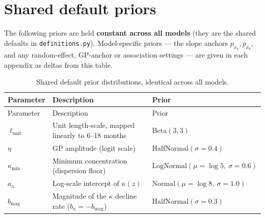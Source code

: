 \documentclass[
  11pt,
  a4paper,
]{report}
\begin{document}
\section{Shared default priors}\label{sec-core-priors}

The following priors are held \textbf{constant across all models} (they
are the shared defaults in \texttt{definitions.py}). Model-specific
priors --- the slope anchors \(p_{x_a}, p_{x_b}\), and any
random-effect, GP-anchor or association settings --- are given in each
appendix as deltas from this table.

\begin{longtable}[]{@{}
  >{\raggedright\arraybackslash}p{}
  >{\raggedright\arraybackslash}p{}
  >{\raggedright\arraybackslash}p{}@{}}
\caption{Shared default prior distributions, identical across all
models.}\label{tbl-core-priors}\tabularnewline
\toprule\noalign{}
\begin{minipage}[b]{\linewidth}\raggedright
Parameter
\end{minipage} & \begin{minipage}[b]{\linewidth}\raggedright
Description
\end{minipage} & \begin{minipage}[b]{\linewidth}\raggedright
Prior
\end{minipage} \\
\midrule\noalign{}
\endfirsthead
\toprule\noalign{}
\begin{minipage}[b]{\linewidth}\raggedright
Parameter
\end{minipage} & \begin{minipage}[b]{\linewidth}\raggedright
Description
\end{minipage} & \begin{minipage}[b]{\linewidth}\raggedright
Prior
\end{minipage} \\
\midrule\noalign{}
\endhead
\bottomrule\noalign{}
\endlastfoot
\(\ell_\text{unit}\) & Unit length-scale, mapped linearly to 6--18
months & \(\mathrm{Beta}(3, 3)\) \\
\(\eta\) & GP amplitude (logit scale) &
\(\mathrm{HalfNormal}(\sigma = 0.4)\) \\
\(\kappa_{\min}\) & Minimum concentration (dispersion floor) &
\(\mathrm{LogNormal}(\mu = \log 5,\ \sigma = 0.6)\) \\
\(a_\kappa\) & Log-scale intercept of \(\kappa(z)\) &
\(\mathrm{Normal}(\mu = \log 8,\ \sigma = 1.0)\) \\
\(b_{\mathrm{mag}}\) & Magnitude of the \(\kappa\) decline rate
(\(b_\kappa = -b_{\mathrm{mag}}\)) &
\(\mathrm{HalfNormal}(\sigma = 0.3)\) \\
\end{longtable}
\end{document}
